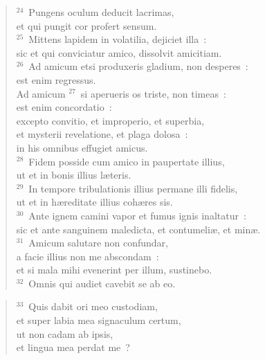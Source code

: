 \begin{verse}${}^{24}$~Pungens oculum deducit lacrimas,\\ et qui pungit cor profert sensum.\\
${}^{25}$~Mittens lapidem in volatilia, dejiciet illa~:\\ sic et qui conviciatur amico, dissolvit amicitiam.\\
${}^{26}$~Ad amicum etsi produxeris gladium, non desperes~:\\ est enim regressus.\\ Ad amicum
${}^{27}$~si aperueris os triste, non timeas~:\\ est enim concordatio~:\\ excepto convitio, et improperio, et superbia,\\ et mysterii revelatione, et plaga dolosa~:\\ in his omnibus effugiet amicus.\\
${}^{28}$~Fidem posside cum amico in paupertate illius,\\ ut et in bonis illius l\ae teris.\\
${}^{29}$~In tempore tribulationis illius permane illi fidelis,\\ ut et in h\ae reditate illius coh\ae res sis.\\
${}^{30}$~Ante ignem camini vapor et fumus ignis inaltatur~:\\ sic et ante sanguinem maledicta, et contumeli\ae , et min\ae .\\
${}^{31}$~Amicum salutare non confundar,\\ a facie illius non me abscondam~:\\ et si mala mihi evenerint per illum, sustinebo.\\
${}^{32}$~Omnis qui audiet cavebit se ab eo.\end{verse}


\begin{verse}${}^{33}$~Quis dabit ori meo custodiam,\\ et super labia mea signaculum certum,\\ ut non cadam ab ipsis,\\ et lingua mea perdat me~?\end{verse}


